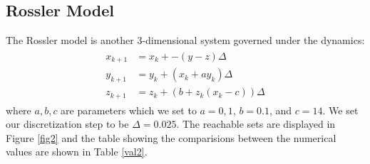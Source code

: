 \documentclass[EPiC]{easychair}
\begin{document}
\subsection{Rossler Model}
\noindent The Rossler model is another 3-dimensional system governed under the dynamics:
\begin{align} \label{rossler}
    \begin{split}
        x_{k+1} &= x_k + -(y-z)\Delta \\
        y_{k+1} &= y_k + (x_k + ay_k)\Delta \\
        z_{k+1} &= z_k + (b + z_k(x_k - c))\Delta
    \end{split}
\end{align}
where $a,b,c$ are parameters which we set to $a = 0,1$, $b =0.1$, and $c = 14$. We set our discretization step to be $\Delta= 0.025$.
The reachable sets are displayed in Figure \ref{fig2} and the table showing the comparisions between the numerical values are shown in Table \ref{val2}.

\end{document}
